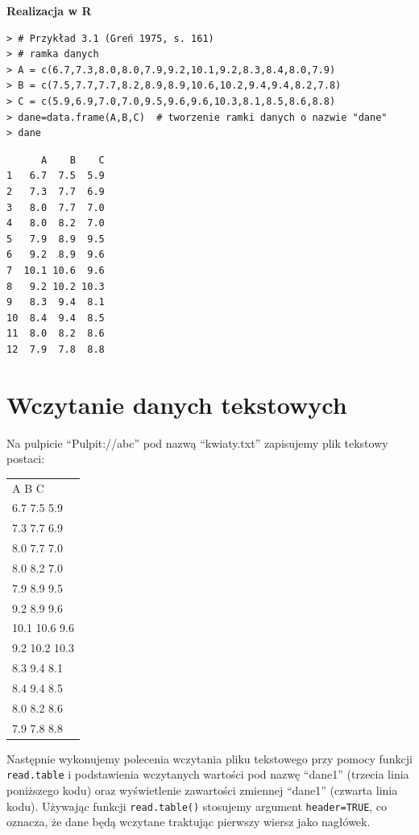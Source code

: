 \documentclass[12pt,B5paper,]{book}
\begin{document}
\newpage

\textbf{Realizacja w R}

\begin{verbatim}
> # Przykład 3.1 (Greń 1975, s. 161)
> # ramka danych
> A = c(6.7,7.3,8.0,8.0,7.9,9.2,10.1,9.2,8.3,8.4,8.0,7.9)
> B = c(7.5,7.7,7.7,8.2,8.9,8.9,10.6,10.2,9.4,9.4,8.2,7.8)
> C = c(5.9,6.9,7.0,7.0,9.5,9.6,9.6,10.3,8.1,8.5,8.6,8.8)
> dane=data.frame(A,B,C)  # tworzenie ramki danych o nazwie "dane"
> dane
\end{verbatim}

\begin{verbatim}
      A    B    C
1   6.7  7.5  5.9
2   7.3  7.7  6.9
3   8.0  7.7  7.0
4   8.0  8.2  7.0
5   7.9  8.9  9.5
6   9.2  8.9  9.6
7  10.1 10.6  9.6
8   9.2 10.2 10.3
9   8.3  9.4  8.1
10  8.4  9.4  8.5
11  8.0  8.2  8.6
12  7.9  7.8  8.8
\end{verbatim}

\newpage

\section{Wczytanie danych tekstowych}\label{wczytanie-danych-tekstowych}

Na pulpicie ``Pulpit://abc'' pod nazwą ``kwiaty.txt'' zapisujemy plik
tekstowy postaci:

\begin{table}[H]
\centering
\label{dane1}
\begin{tabular}{l}
A    B    C    \\
6.7  7.5  5.9  \\
7.3  7.7  6.9  \\
8.0  7.7  7.0  \\
8.0  8.2  7.0  \\
7.9  8.9  9.5  \\
9.2  8.9  9.6  \\
10.1 10.6  9.6 \\
9.2 10.2 10.3  \\
8.3  9.4  8.1  \\
8.4  9.4  8.5  \\
8.0  8.2  8.6  \\
7.9  7.8  8.8 
\end{tabular}
\end{table}

Następnie wykonujemy polecenia wczytania pliku tekstowego przy pomocy
funkcji \texttt{read.table} i podstawienia wczytanych wartości pod nazwę
``dane1'' (trzecia linia poniższego kodu) oraz wyświetlenie zawartości
zmiennej ``dane1'' (czwarta linia kodu). Używając funkcji
\texttt{read.table()} stosujemy argument \texttt{header=TRUE}, co
oznacza, że dane będą wczytane traktując pierwszy wiersz jako nagłówek.
\end{document}
